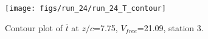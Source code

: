 \begin{figure}[H]
\centering
\texttt{[image: figs/run\_24/run\_24\_T\_contour]}
\caption{Contour plot of $\overline{t}$ at $z/c$=7.75, $V_{free}$=21.09, station 3.}
\label{fig:run_24_T_contour}
\end{figure}


